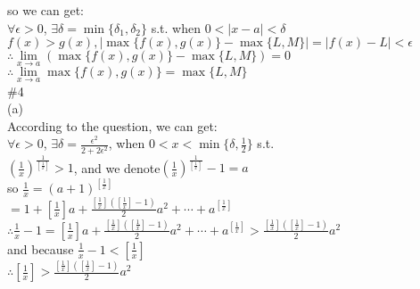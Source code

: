 \documentclass{article}
\begin{document}
so we can get:\\

$\forall\epsilon>0$, $\exists\delta=\min\{\delta_1,\delta_2\}$ s.t. when $0<|x-a|<\delta$\\

$f(x)>g(x), |\max\{f(x),g(x)\}-\max\{L,M\}|=|f(x)-L|<\epsilon$\\

$\therefore$\qquad$\lim \limits_{x \to a}\left(\max\{f(x),g(x)\}-\max\{L,M\}\right)=0$\\

$\therefore$\qquad$\lim \limits_{x \to a}\max\{f(x),g(x)\}=\max\{L,M\}$\\

\textcolor[rgb]{0.00,0.00,0.50}{\#4}\\

(a)\\

According to the question, we can get:\\

$\forall\epsilon>0$, $\exists\delta=\displaystyle\frac{\epsilon^2}{2+2\epsilon^2}$, when $0<x<\min\{\delta,\frac{1}{2}\}$ s.t.\\

$\displaystyle\left(\frac{1}{x}\right)^{\frac{1}{\left[\frac{1}{x}\right]}}>1$, and we denote$\displaystyle\left(\frac{1}{x}\right)^{\frac{1}{\left[\frac{1}{x}\right]}}-1=a$\\

so $\displaystyle\frac{1}{x}=(a+1)^{\left[\frac{1}{x}\right]}$\\

\qquad$=\displaystyle1+\left[\frac{1}{x}\right]a+\frac{\left[\frac{1}{x}\right]\left(\left[\frac{1}{x}\right]-1\right)}{2}a^2+\cdots+a^{\left[\frac{1}{x}\right]}$\\

$\therefore$\qquad$\frac{1}{x}-1=\displaystyle\left[\frac{1}{x}\right]a+\frac{\left[\frac{1}{x}\right]\left(\left[\frac{1}{x}\right]-1\right)}{2}a^2+\cdots+a^{\left[\frac{1}{x}\right]}>\frac{\left[\frac{1}{x}\right]\left(\left[\frac{1}{x}\right]-1\right)}{2}a^2$\\

and because $\displaystyle\frac{1}{x}-1<\left[\frac{1}{x}\right]$\\

$\therefore$\qquad$\left[\frac{1}{x}\right]>\frac{\left[\frac{1}{x}\right]\left(\left[\frac{1}{x}\right]-1\right)}{2}a^2$\\
\end{document}
